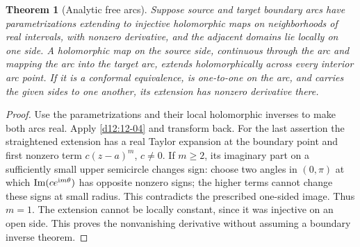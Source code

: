 \documentclass[11pt,a4paper,openany]{book}
\newtheorem{theorem}{Theorem}[chapter]
\theoremstyle{definition}
\theoremstyle{remark}\newtheorem{remark}[theorem]{Remark}
\newcommand{\family}[1]{}
\begin{document}
\begin{theorem}[Analytic free arcs]\family{D12.12.05}\label{d12:12-05}
Suppose source and target boundary arcs have parametrizations extending to injective holomorphic maps on neighborhoods of real intervals, with nonzero derivative, and the adjacent domains lie locally on one side. A holomorphic map on the source side, continuous through the arc and mapping the arc into the target arc, extends holomorphically across every interior arc point. If it is a conformal equivalence, is one-to-one on the arc, and carries the given sides to one another, its extension has nonzero derivative there.
\end{theorem}
\begin{proof}
Use the parametrizations and their local holomorphic inverses to make both arcs real. Apply \cref{d12:12-04} and transform back. For the last assertion the straightened extension has a real Taylor expansion at the boundary point and first nonzero term $c(z-a)^m$, $c\ne0$. If $m\ge2$, its imaginary part on a sufficiently small upper semicircle changes sign: choose two angles in $(0,\pi)$ at which $\operatorname{Im}(c e^{\mathrm i m\theta})$ has opposite nonzero signs; the higher terms cannot change these signs at small radius. This contradicts the prescribed one-sided image. Thus $m=1$. The extension cannot be locally constant, since it was injective on an open side. This proves the nonvanishing derivative without assuming a boundary inverse theorem.
\end{proof}
\end{document}
